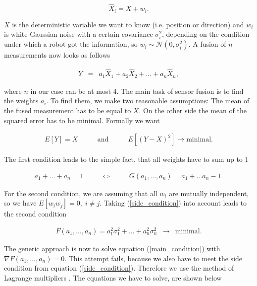 	\[ %
    			\hat{X}_{i} = X + w_i.
	\]

\(X\) is the deterministic variable we want to know (i.e. position or direction) and \(w_i\) is white Gaussian noise with a certain covariance \(\sigma_i^2\), depending on the condition under which a robot got the information, so \(w_i \sim \mathcal{N}(0,\sigma_i^2)\). A fusion of \(n\) measurements now looks as follows

	\begin{eqnarray}\label{fusion}
    			 Y &=& a_1 \hat{X}_{1} + a_2 \hat{X}_{2} + \ldots + a_n \hat{X}_{n},
	\end{eqnarray}

where \(n\) in our case can be at most 4. The main task of sensor fusion is to find the weights \(a_i\). To find them, we make two reasonable assumptions: The mean of the fused measurement has to be equal to \(X\). On the other side the mean of the squared error has to be minimal. Formally we want

	\begin{eqnarray}\label{assumptions}
    			 E[Y] = X \qquad  &\mathrm{and}& \qquad E\left[ (Y-X)^2 \right] \rightarrow 						\mathrm{minimal}.
	\end{eqnarray}

The first condition leads to the simple fact, that all weights have to sum up to \(1\)

	\begin{eqnarray}\label{side_condition}
    			 a_1 + \ldots + a_n = 1 \qquad &\Longleftrightarrow& \qquad G(a_1, \ldots, a_n) = a_1 +   				\ldots a_n - 1.
	\end{eqnarray}

For the second condition, we are assuming that all \(w_i\) are mutually independent, so we have \(E[w_i w_j] = 0, \; i \neq j\). Taking (\ref{side_condition}) into account leads to the second condition

	\begin{eqnarray}\label{main_condition}
    			 F(a_1,\ldots,a_n) = a_1^2\sigma_1^2 + \ldots + a_n^2 \sigma_n^2 &\rightarrow&  					\mathrm{minimal}.
	\end{eqnarray}

The generic approach is now to solve equation (\ref{main_condition}) with \(\nabla F(a_1,\ldots,a_n) = 0\). This attempt fails, because we also have to meet the side condition from equation (\ref{side_condition}). Therefore we use the method of Lagrange multipliers \cite{Blatter}. The equations we have to solve, are shown below

